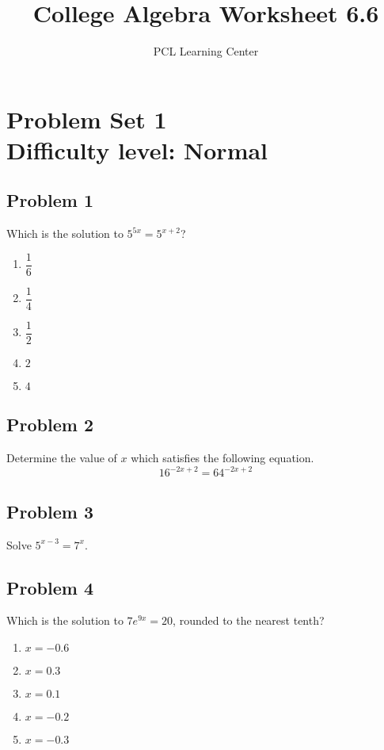 \documentclass[12pt]{article}
\title{College Algebra Worksheet 6.6}
\author{PCL Learning Center}
\date{}
\begin{document}
\maketitle

\section*{Problem Set 1\\Difficulty level: Normal}

\subsection*{Problem 1}
Which is the solution to \( 5^{5x} = 5^{x+2} \)?  
\begin{enumerate}[label=(\alph*)]
    \item \( \dfrac{1}{6} \)
    \item \( \dfrac{1}{4} \)
    \item \( \dfrac{1}{2} \)
    \item \( 2 \)
    \item \( 4 \)
\end{enumerate}

\subsection*{Problem 2}
Determine the value of \( x \) which satisfies the following equation.
\[ 16^{-2x+2} = 64^{-2x+2} \]

\subsection*{Problem 3}
Solve \( 5^{x-3} = 7^x \).

\subsection*{Problem 4}
Which is the solution to \( 7e^{9x} = 20 \), rounded to the nearest tenth?

\begin{enumerate}[label=(\alph*)]
    \item \( x = -0.6 \)
    \item \( x = 0.3 \)
    \item \( x = 0.1 \)
    \item \( x = -0.2 \)
    \item \( x = -0.3 \)
\end{enumerate}
\end{document}
